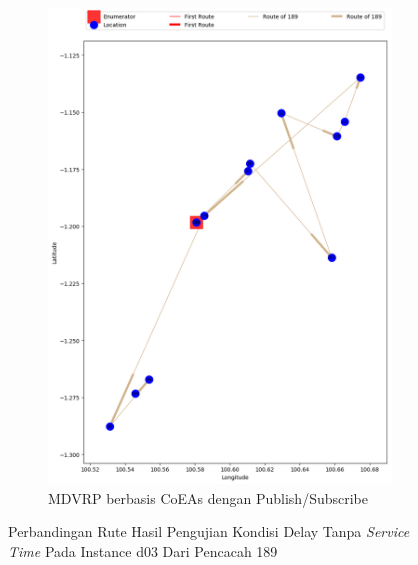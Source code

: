 \begin{figure}[H]\ContinuedFloat
	\centering
	\begin{subfigure}[t]{\textwidth}
		\centering
		\includegraphics[width=\textwidth]{Resources/Images/delayed_3/real_m15_n100_delayed_3_189_pubsub_coes}
		\caption{MDVRP berbasis CoEAs dengan Publish/Subscribe}
		\label{fig:real_m15_n100_delayed_3_189_pubsub_coes}
	\end{subfigure}
	\caption{Perbandingan Rute Hasil Pengujian Kondisi Delay Tanpa \textit{Service Time} Pada Instance d03 Dari Pencacah 189}
	\label{fig:real_m15_n100_delayed_3_189_contd}
\end{figure}



